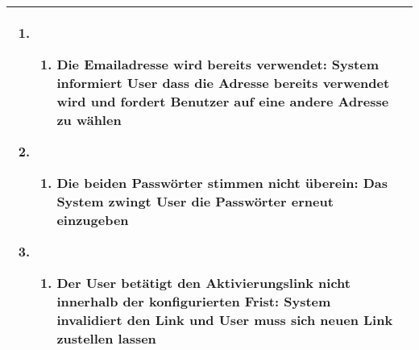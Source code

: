 \begin{tabular}{|l|p{}|}
\begin{enumerate}
\begin{enumerate}
    \end{enumerate}
    \item
    \begin{enumerate}
    \item Die Emailadresse wird bereits verwendet: System informiert User dass die Adresse bereits verwendet wird und fordert Benutzer auf eine andere Adresse zu wählen
    \end{enumerate}
    \item
    \begin{enumerate}
    \item Die beiden Passwörter stimmen nicht überein: Das System zwingt User die Passwörter erneut einzugeben
    \end{enumerate}
    \setcounter{enumi}{8}
    \item
    \begin{enumerate}
    \item Der User betätigt den Aktivierungslink nicht innerhalb der konfigurierten Frist: System invalidiert den Link und User muss sich neuen Link zustellen lassen
    \end{enumerate}
\end{enumerate}
\\ \hline
\end{tabular}